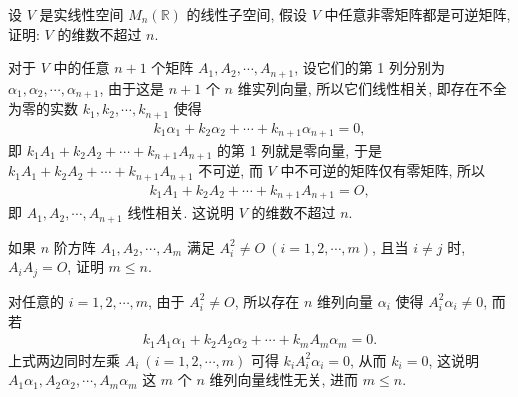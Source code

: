 \documentclass[../../main.tex]{subfiles}%
\begin{document}
\begin{example}
设 \(V\) 是实线性空间 \(M_n(\mathbb{R})\) 的线性子空间, 假设 \(V\) 中任意非零矩阵都是可逆矩阵, 证明: \(V\) 的维数不超过 \(n\).
\end{example}
\begin{solution}
对于 \(V\) 中的任意 \(n+1\) 个矩阵 \(A_1, A_2, \cdots, A_{n+1}\), 设它们的第 1 列分别为 \(\alpha_1, \alpha_2, \cdots, \alpha_{n+1}\), 由于这是 \(n+1\) 个 \(n\) 维实列向量, 所以它们线性相关, 即存在不全为零的实数 \(k_1, k_2, \cdots, k_{n+1}\) 使得
\begin{align*}
k_1 \alpha_1 + k_2 \alpha_2 + \cdots + k_{n+1} \alpha_{n+1} = 0,
\end{align*}
即 \(k_1 A_1 + k_2 A_2 + \cdots + k_{n+1} A_{n+1}\) 的第 1 列就是零向量, 于是 \(k_1 A_1 + k_2 A_2 + \cdots + k_{n+1} A_{n+1}\) 不可逆, 而 \(V\) 中不可逆的矩阵仅有零矩阵, 所以
\begin{align*}
k_1 A_1 + k_2 A_2 + \cdots + k_{n+1} A_{n+1} = O,
\end{align*}即 \(A_1, A_2, \cdots, A_{n+1}\) 线性相关. 这说明 \(V\) 的维数不超过 \(n\).
\end{solution}

\begin{example}
如果 \(n\) 阶方阵 \(A_1, A_2, \cdots, A_m\) 满足 \(A_i^2 \neq O \ (i = 1, 2, \cdots, m)\), 且当 \(i \neq j\) 时, \(A_i A_j = O\), 证明 \(m \leqslant n\).
\end{example}
\begin{solution}
对任意的 \(i = 1, 2, \cdots, m\), 由于 \(A_i^2 \neq O\), 所以存在 \(n\) 维列向量 \(\alpha_i\) 使得 \(A_i^2 \alpha_i \neq 0\), 而若
\begin{align*}
k_1 A_1 \alpha_1 + k_2 A_2 \alpha_2 + \cdots + k_m A_m \alpha_m = 0.
\end{align*}上式两边同时左乘 \(A_i \ (i = 1, 2, \cdots, m)\) 可得 \(k_i A_i^2 \alpha_i = 0\), 从而 \(k_i = 0\), 这说明 \(A_1 \alpha_1, A_2 \alpha_2, \cdots, A_m \alpha_m\) 这 \(m\) 个 \(n\) 维列向量线性无关, 进而 \(m \leqslant n\). 
\end{solution}
\end{document}
